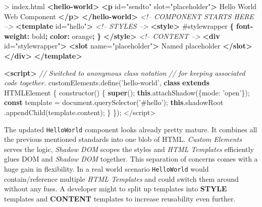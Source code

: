 \documentclass[]{assets/latex/ieee}
\newenvironment{Shaded}{}{}
\newcommand{\KeywordTok}[1]{\textcolor[rgb]{0.00,0.44,0.13}{\textbf{{#1}}}}
\newcommand{\DataTypeTok}[1]{\textcolor[rgb]{0.56,0.13,0.00}{{#1}}}
\newcommand{\FloatTok}[1]{\textcolor[rgb]{0.25,0.63,0.44}{{#1}}}
\newcommand{\StringTok}[1]{\textcolor[rgb]{0.25,0.44,0.63}{{#1}}}
\newcommand{\SpecialStringTok}[1]{\textcolor[rgb]{0.73,0.40,0.53}{{#1}}}
\newcommand{\CommentTok}[1]{\textcolor[rgb]{0.38,0.63,0.69}{\textit{{#1}}}}
\newcommand{\OtherTok}[1]{\textcolor[rgb]{0.00,0.44,0.13}{{#1}}}
\newcommand{\VariableTok}[1]{\textcolor[rgb]{0.10,0.09,0.49}{{#1}}}
\newcommand{\OperatorTok}[1]{\textcolor[rgb]{0.40,0.40,0.40}{{#1}}}
\newcommand{\AttributeTok}[1]{\textcolor[rgb]{0.49,0.56,0.16}{{#1}}}
\newcommand{\NormalTok}[1]{{#1}}
\begin{document}
\begin{Shaded}
\begin{Highlighting}[]
\NormalTok{> index.html}
\KeywordTok{<hello-world>}
  \KeywordTok{<p}\OtherTok{ id=}\StringTok{"sendto"}\OtherTok{ slot=}\StringTok{"placeholder"}\KeywordTok{>}
    \NormalTok{Hello World Web Component    }
  \KeywordTok{</p>}
\KeywordTok{</hello-world>}
\CommentTok{<!-- COMPONENT STARTS HERE -->}
\KeywordTok{<template}\OtherTok{ id=}\StringTok{"hello"}\KeywordTok{>}
  \CommentTok{<!-- STYLES -->}
  \KeywordTok{<style>}
    \FloatTok{#stylewrapper} \KeywordTok{\{}
      \KeywordTok{font-weight:} \DataTypeTok{bold}\KeywordTok{;}
      \KeywordTok{color:} \NormalTok{orange}\KeywordTok{;}
    \KeywordTok{\}}
  \KeywordTok{</style>}
  \CommentTok{<!-- CONTENT -->}
  \KeywordTok{<div}\OtherTok{ id=}\StringTok{"stylewrapper"}\KeywordTok{>}
    \KeywordTok{<slot}\OtherTok{ name=}\StringTok{"placeholder"}\KeywordTok{>}
      \NormalTok{Named placeholder}
    \KeywordTok{</slot>}
  \KeywordTok{</div>}
\KeywordTok{</template>}

\KeywordTok{<script>}
  \CommentTok{// Switched to anonymous class notation}
  \CommentTok{// for keeping associated code together.}
  \VariableTok{customElements}\NormalTok{.}\AttributeTok{define}\NormalTok{(}\StringTok{'hello-world'}\OperatorTok{,}
    \KeywordTok{class} \KeywordTok{extends} \NormalTok{HTMLElement }\OperatorTok{\{}
     \AttributeTok{constructor}\NormalTok{() }\OperatorTok{\{}
       \KeywordTok{super}\NormalTok{()}\OperatorTok{;}
       \KeywordTok{this}\NormalTok{.}\AttributeTok{attachShadow}\NormalTok{(}\OperatorTok{\{}\DataTypeTok{mode}\OperatorTok{:} \StringTok{'open'}\OperatorTok{\}}\NormalTok{)}\OperatorTok{;}
       \KeywordTok{const} \NormalTok{template }\OperatorTok{=}
         \VariableTok{document}\NormalTok{.}\AttributeTok{querySelector}\NormalTok{(}\StringTok{'#hello'}\NormalTok{)}\OperatorTok{;}
       \KeywordTok{this}\NormalTok{.}\AttributeTok{shadowRoot}
         \NormalTok{.}\AttributeTok{appendChild}\NormalTok{(}\VariableTok{template}\NormalTok{.}\AttributeTok{content}\NormalTok{)}\OperatorTok{;}
     \OperatorTok{\}}
   \OperatorTok{\}}\NormalTok{)}\OperatorTok{;}
\OperatorTok{<}\SpecialStringTok{/script>}
\end{Highlighting}
\end{Shaded}

The updated \texttt{HelloWorld} component looks already pretty mature.
It combines all the previous mentioned standards into one blob of HTML.
\emph{Custom Elements} serves the logic, \emph{Shadow DOM} scopes the
styles and \emph{HTML Templates} efficiently glues DOM and \emph{Shadow
DOM} together. This separation of concerns comes with a huge gain in
flexibility. In a real world scenario \texttt{HelloWorld} would
contain/reference multiple \emph{HTML Templates} and could switch them
around without any fuss. A developer might to split up templates into
\textbf{STYLE} templates and \textbf{CONTENT} templates to increase
reusability even further.
\end{document}
